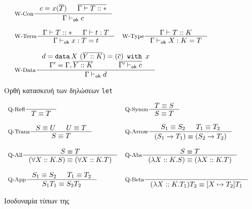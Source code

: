 \newcommand{\provesok}{\vdash_{\textsf{ok}}}
\begin{figure}[!ht]
    \centering
    \begin{minipage}[t]{15cm}
    \centering
    \begin{displaymath}
    \begin{array}{ll}
    \inference[W-Con]{c = x(\seq{T}) & \seq{\Gamma \vdash T::\Type}}{\Gamma \provesok c} \\
    \\
    \inference[W-Term]{
      \Gamma \vdash T :: \Type & 
      \Gamma \vdash t : T}{\Gamma \provesok x : T = t} &
    \inference[W-Type]{\Gamma \vdash T :: K}{\Gamma \provesok X : K = T}\\
    \\
    \multicolumn{2}{l}{\inference[W-Data]{
      d=\datatype{X}{(\seq{Y :: K})}{x}{(\seq{c})} \\
      \Gamma^\prime = \Gamma, \seq{Y::K} &
      \seq{\Gamma^\prime \provesok c}}{\Gamma \provesok d}}\\
    \end{array}
    \end{displaymath}
    \end{minipage}
    \caption{Ορθή κατασκευή των δηλώσεων \texttt{let} }
    \label{fig:fir_wellformed}
\end{figure}

\begin{figure}[!ht]
    \centering
    \begin{minipage}[t]{15cm}
    \centering
    \begin{displaymath}
    \begin{array}{ll}
    \inference[Q-Refl]{}{T \equiv T} &
    \inference[Q-Symm]{T \equiv S}{S \equiv T}  \\
    \\
    \inference[Q-Trans]{S \equiv U & U \equiv T}{S \equiv T} &
    \inference[Q-Arrow]{S_1 \equiv S_2 & T_1 \equiv T_2}{(S_1 \typeArrow T_1) \equiv (S_2 \typeArrow T_2)} \\
    \\
    \inference[Q-All]{S \equiv T}{(\forall X::K.S) \equiv (\forall X::K.T)} &
    \inference[Q-Abs]{S \equiv T}{(\lambda X::K.S) \equiv (\lambda X::K.T)} \\
    \\
    \inference[Q-App]{S_1 \equiv S_2 & T_1 \equiv T_2}{S_1 T_1 \equiv S_2 T_2} &
    \inference[Q-Beta]{}{(\lambda X::K.T_1)T_2 \equiv \subst{X}{T_2}{T_1}}
    \end{array}
    \end{displaymath}
    \end{minipage}
    \caption{Ισοδυναμία τύπων της \FIR}
    \label{fig:fir_typeq}
\end{figure}


